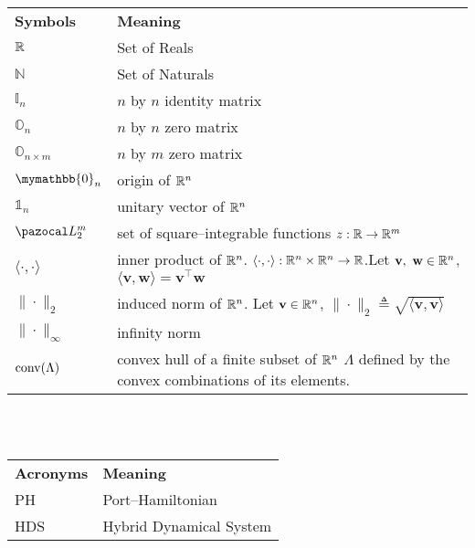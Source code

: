 \mbox{}\\
\mbox{}\\
\begin{tabularx}{0.95\textwidth}{p{2.75cm} X}
\textbf{Symbols} 			& \textbf{Meaning}\\
 $\mathbb{R}$                       & Set of Reals\\
 $\mathbb{N}$               & Set of Naturals\\
 $\mathbb{I}_n$             & $n$ by $n$ identity matrix\\
 $\mathbb{O}_n$             & $n$ by $n$ zero matrix\\
 $\mathbb{O}_{n\times m}$   & $n$ by $m$ zero matrix\\
 $\mymathbb{0}_n$           & origin of $\mathbb{R}^n$\\
 $\mathbb{1}_n$             & unitary vector of $\mathbb{R}^n$\\
 $\La_2^m$                  & set of square--integrable functions $z:\mathbb{R}\rightarrow\mathbb{R}^m$\\
 $\langle \cdot,\cdot\rangle$ & {inner product of $\mathbb{R}^n$. $\langle \cdot,\cdot\rangle:\mathbb{R}^n\times\mathbb{R}^n\rightarrow\mathbb{R}$.\newline Let $\mathbf{v},~\mathbf{w}\in\mathbb{R}^n$, $\langle \mathbf{v},\mathbf{w}\rangle = \mathbf{v}^\top \mathbf{w}$} \\
 $\|\cdot\|_2$              & induced norm of $\mathbb{R}^n$. Let $\mathbf{v}\in\mathbb{R}^n$, $\|\cdot\|_2\triangleq\sqrt{\langle \mathbf{v},\mathbf{v}\rangle}$ \\
 $\|\cdot\|_\infty$         & infinity norm\\
 $\operatorname{conv}(\Lambda)$           & convex hull of a finite subset of $\mathbb{R}^n$ $\Lambda$ defined by the convex combinations of its elements. 
\end{tabularx}

\mbox{}\\
\mbox{}\\
\begin{tabularx}{0.95\textwidth}{p{2.75cm} X}
 \textbf{Acronyms} 			& \textbf{Meaning}\\
PH				    & Port--Hamiltonian\\
HDS					& Hybrid Dynamical System\\
\end{tabularx}
